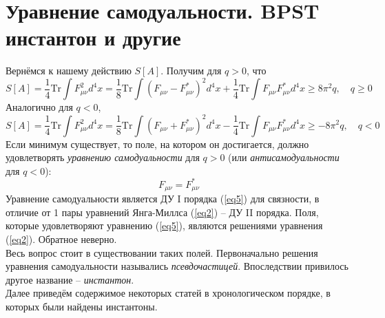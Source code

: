 \documentclass[12pt]{article}
\theoremstyle{definition}
\begin{document}
\section{Уравнение самодуальности. BPST инстантон и другие}
Вернёмся к нашему действию $S[A]$. Получим для $q>0$, что
\begin{equation}
    S[A]=\frac{1}{4}\text{Tr}\int F_{\mu\nu}^2d^4 x=\frac{1}{8}\text{Tr}\int\left(F_{\mu\nu}-F_{\mu\nu}^*\right)^2 d^4x+\frac{1}{4}\text{Tr} \int F_{\mu \nu} F_{\mu \nu}^*d^4x\geq 8\pi^2q,\quad q\geq0
\end{equation}
Аналогично для $q<0$,
\begin{equation}
    S[A]=\frac{1}{4}\text{Tr}\int F_{\mu\nu}^2d^4 x=\frac{1}{8}\text{Tr}\int\left(F_{\mu\nu}+F_{\mu\nu}^*\right)^2 d^4x-\frac{1}{4}\text{Tr} \int F_{\mu\nu} F_{\mu \nu}^*d^4x\geq-8\pi^2q,\quad q<0
\end{equation}
Если минимум существует, то поле, на котором он достигается, должно удовлетворять \textit{уравнению самодуальности} для $q>0$ (или \textit{антисамодуальности} для $q<0$):
\begin{equation}\label{eq5}
    F_{\mu\nu}=F^*_{\mu \nu}
\end{equation}
Уравнение самодуальности является ДУ I порядка (\ref{eq5}) для связности, в отличие от 1 пары уравнений Янга-Миллса (\ref{eq2}) -- ДУ II порядка. Поля, которые удовлетворяют уравнению (\ref{eq5}), являются решениями уравнения (\ref{eq2}). Обратное неверно.\\
Весь вопрос стоит в существовании таких полей. Первоначально решения уравнения самодуальности назывались \textit{псевдочастицей}. Впоследствии привилось другое название -- \textit{инстантон}.\\
Далее приведём содержимое некоторых статей в хронологическом порядке, в которых были найдены инстантоны.
\end{document}
